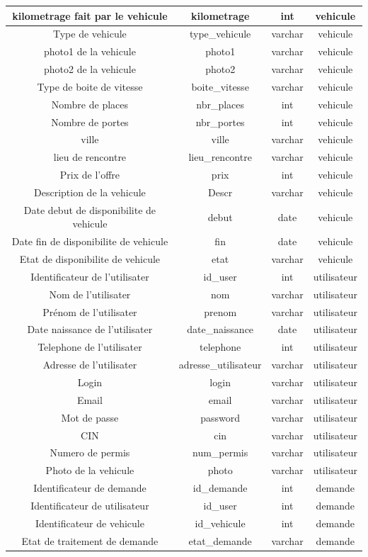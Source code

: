 \begin{center}
\begin{table}[htp]
\begin{tabular}{||c||  c||  c||  c||}
 kilometrage fait par le vehicule& kilometrage & int & vehicule \\
 \hline
  Type de vehicule& type\_vehicule & varchar & vehicule \\ 
 \hline
 photo1 de la vehicule& photo1 & varchar & vehicule \\
 \hline
 photo2 de la vehicule& photo2 & varchar & vehicule \\
 \hline
 Type de boite de vitesse& boite\_vitesse & varchar & vehicule \\
 \hline
 Nombre de places& nbr\_places & int & vehicule \\
 \hline
 Nombre de portes& nbr\_portes & int & vehicule \\
 \hline 
 ville & ville & varchar & vehicule \\
 \hline
 lieu de rencontre & lieu\_rencontre & varchar & vehicule \\
 \hline 
 Prix de l'offre& prix & int & vehicule \\
 \hline 
 Description de la vehicule& Descr & varchar & vehicule \\
 \hline 
 Date debut de disponibilite de vehicule& debut & date & vehicule \\
 \hline
 Date fin de disponibilite de vehicule&  fin & date & vehicule \\
 \hline 
 Etat de disponibilite de vehicule& etat & varchar & vehicule \\
 \hline
 Identificateur  de l'utilisater& id\_user & int & utilisateur \\
 \hline
 Nom  de l'utilisater& nom & varchar & utilisateur \\
 \hline
  Prénom  de l'utilisater& prenom & varchar & utilisateur \\
 \hline
 Date naissance  de l'utilisater & date\_naissance & date & utilisateur \\
 \hline
  Telephone  de l'utilisater& telephone & int & utilisateur \\
 \hline
 Adresse de l'utilisater & adresse\_utilisateur & varchar & utilisateur \\
 \hline 
 Login& login & varchar & utilisateur \\
 \hline 
 Email& email & varchar & utilisateur \\
 \hline 
 Mot de passe & password & varchar & utilisateur \\
 \hline 
 CIN & cin & varchar & utilisateur \\
 \hline 
  Numero de permis & num\_permis & varchar & utilisateur \\
 \hline 
  Photo de la vehicule& photo & varchar & utilisateur \\
 \hline 
  Identificateur de demande& id\_demande & int & demande \\
 \hline 
 Identificateur de utilisateur& id\_user & int & demande \\
 \hline 
  Identificateur de vehicule& id\_vehicule & int & demande \\
 \hline 
  Etat de traitement de demande & etat\_demande & varchar & demande \\
 \hline 



\end{tabular}
\end{table}
\end{center}
